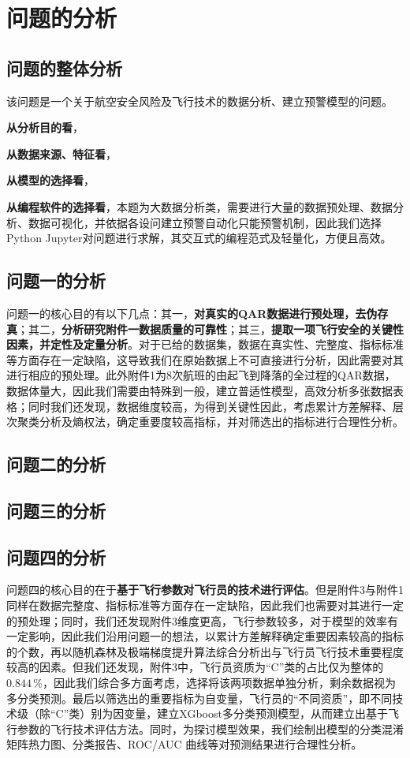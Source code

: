 \documentclass{MathorCupModeling}
\begin{document}
	\section{问题的分析}
	\subsection{问题的整体分析}
	该问题是一个关于航空安全风险及飞行技术的数据分析、建立预警模型的问题。
	
	\textbf{从分析目的看}，

	\textbf{从数据来源、特征看}，
	
	\textbf{从模型的选择看}，

	\textbf{从编程软件的选择看}，本题为大数据分析类，需要进行大量的数据预处理、数据分析、数据可视化，并依据各设问建立预警自动化只能预警机制，因此我们选择Python Jupyter对问题进行求解，其交互式的编程范式及轻量化，方便且高效。
	
	\subsection{问题一的分析}
	问题一的核心目的有以下几点：{\heiti 其一}，\textbf{对真实的QAR数据进行预处理，去伪存真}；{\heiti 其二}，\textbf{分析研究附件一数据质量的可靠性}；{\heiti 其三}，\textbf{提取一项飞行安全的关键性因素，并定性及定量分析}。对于已给的数据集，数据在真实性、完整度、指标标准等方面存在一定缺陷，这导致我们在原始数据上不可直接进行分析，因此需要对其进行相应的预处理。此外附件1为8次航班的由起飞到降落的全过程的QAR数据，数据体量大，因此我们需要由特殊到一般，建立普适性模型，高效分析多张数据表格；同时我们还发现，数据维度较高，为得到关键性因此，考虑累计方差解释、层次聚类分析及熵权法，确定重要度较高指标，并对筛选出的指标进行合理性分析。
	\subsection{问题二的分析}
	\subsection{问题三的分析}
	\subsection{问题四的分析}
	问题四的核心目的在于\textbf{基于飞行参数对飞行员的技术进行评估}。但是附件3与附件1同样在数据完整度、指标标准等方面存在一定缺陷，因此我们也需要对其进行一定的预处理；同时，我们还发现附件3维度更高，飞行参数较多，对于模型的效率有一定影响，因此我们沿用问题一的想法，以累计方差解释确定重要因素较高的指标的个数，再以随机森林及极端梯度提升算法综合分析出与飞行员飞行技术重要程度较高的因素。但我们还发现，附件3中，飞行员资质为“C”类的占比仅为整体的$0.844\,\%$，因此我们综合多方面考虑，选择将该两项数据单独分析，剩余数据视为多分类预测。最后以筛选出的重要指标为自变量，飞行员的“不同资质”，即不同技术级（除“C”类）别为因变量，建立XGboost多分类预测模型，从而建立出基于飞行参数的飞行技术评估方法。同时，为探讨模型效果，我们绘制出模型的{\heiti 分类混淆矩阵热力图}、{\heiti 分类报告}、{\heiti ROC/AUC	曲线}等对预测结果进行合理性分析。
\end{document}

